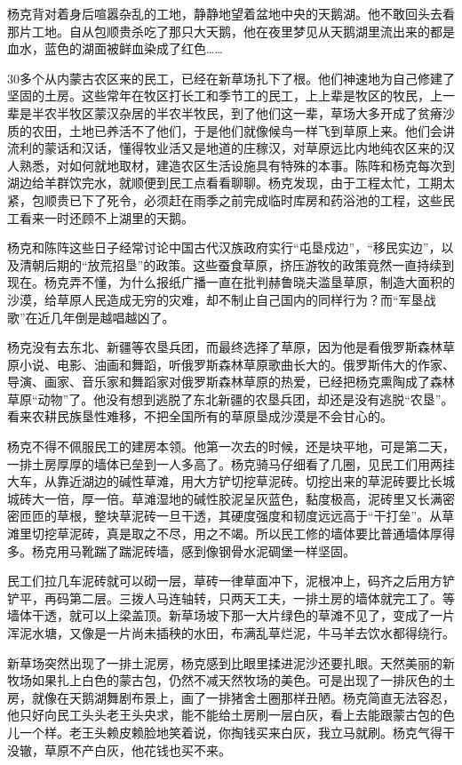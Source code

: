 \par 杨克背对着身后喧嚣杂乱的工地，静静地望着盆地中央的天鹅湖。他不敢回头去看那片工地。自从包顺贵杀吃了那只大天鹅，他在夜里梦见从天鹅湖里流出来的都是血水，蓝色的湖面被鲜血染成了红色……
\par 30多个从内蒙古农区来的民工，已经在新草场扎下了根。他们神速地为自己修建了坚固的土房。这些常年在牧区打长工和季节工的民工，上上辈是牧区的牧民，上一辈是半农半牧区蒙汉杂居的半农半牧民，到了他们这一辈，草场大多开成了贫瘠沙质的农田，土地已养活不了他们，于是他们就像候鸟一样飞到草原上来。他们会讲流利的蒙话和汉话，懂得牧业活又是地道的庄稼汉，对草原远比内地纯农区来的汉人熟悉，对如何就地取材，建造农区生活设施具有特殊的本事。陈阵和杨克每次到湖边给羊群饮完水，就顺便到民工点看看聊聊。杨克发现，由于工程太忙，工期太紧，包顺贵已下了死令，必须赶在雨季之前完成临时库房和药浴池的工程，这些民工看来一时还顾不上湖里的天鹅。
\par 杨克和陈阵这些日子经常讨论中国古代汉族政府实行“屯垦戍边”，“移民实边”，以及清朝后期的“放荒招垦”的政策。这些蚕食草原，挤压游牧的政策竟然一直持续到现在。杨克弄不懂，为什么报纸广播一直在批判赫鲁晓夫滥垦草原，制造大面积的沙漠，给草原人民造成无穷的灾难，却不制止自己国内的同样行为？而“军垦战歌”在近几年倒是越唱越凶了。
\par 杨克没有去东北、新疆等农垦兵团，而最终选择了草原，因为他是看俄罗斯森林草原小说、电影、油画和舞蹈，听俄罗斯森林草原歌曲长大的。俄罗斯伟大的作家、导演、画家、音乐家和舞蹈家对俄罗斯森林草原的热爱，已经把杨克熏陶成了森林草原“动物”了。他没有想到逃脱了东北新疆的农垦兵团，却还是没有逃脱“农垦”。看来农耕民族垦性难移，不把全国所有的草原垦成沙漠是不会甘心的。
\par 杨克不得不佩服民工的建房本领。他第一次去的时候，还是块平地，可是第二天，一排土房厚厚的墙体已垒到一人多高了。杨克骑马仔细看了几圈，见民工们用两挂大车，从靠近湖边的碱性草滩，用大方铲切挖草泥砖。切挖出来的草泥砖要比长城城砖大一倍，厚一倍。草滩湿地的碱性胶泥呈灰蓝色，黏度极高，泥砖里又长满密密匝匝的草根，整块草泥砖一旦干透，其硬度强度和韧度远远高于“干打垒”。从草滩里切挖草泥砖，真是取之不尽，用之不竭。所以民工修的墙体要比普通墙体厚得多。杨克用马靴踹了踹泥砖墙，感到像钢骨水泥碉堡一样坚固。
\par 民工们拉几车泥砖就可以砌一层，草砖一律草面冲下，泥根冲上，码齐之后用方铲铲平，再码第二层。三拨人马连轴转，只两天工夫，一排土房的墙体就完工了。等墙体干透，就可以上梁盖顶。新草场坡下那一大片绿色的草滩不见了，变成了一片浑泥水塘，又像是一片尚未插秧的水田，布满乱草烂泥，牛马羊去饮水都得绕行。
\par 新草场突然出现了一排土泥房，杨克感到比眼里揉进泥沙还要扎眼。天然美丽的新牧场如果扎上白色的蒙古包，仍然不减天然牧场的美色。可是出现了一排灰色的土房，就像在天鹅湖舞剧布景上，画了一排猪舍土圈那样丑陋。杨克简直无法容忍，他只好向民工头头老王头央求，能不能给土房刷一层白灰，看上去能跟蒙古包的色儿一个样。老王头赖皮赖脸地笑着说，你掏钱买来白灰，我立马就刷。杨克气得干没辙，草原不产白灰，他花钱也买不来。
